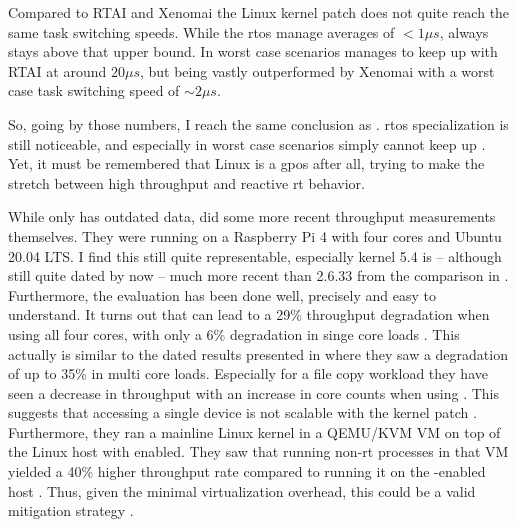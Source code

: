 \documentclass[10pt,twocolumn,a4paper]{article}
\begin{document}
Compared to RTAI and Xenomai the Linux kernel patch does not quite reach the same task switching speeds.
While the \acrshort{rtos} manage averages of $<1\mu s$,  always stays above that upper bound.
In worst case scenarios  manages to keep up with RTAI at around $20\mu s$, but being vastly outperformed by Xenomai with a worst case task switching speed of $\sim 2\mu s$.

So, going by those numbers, I reach the same conclusion as \cite{reghenzani_realtime_2019}.
\acrshort{rtos} specialization is still noticeable, and especially in worst case scenarios  simply cannot keep up \cite{reghenzani_realtime_2019}.
Yet, it must be remembered that Linux is a \acrshort{gpos} after all, trying to make the stretch between high throughput and reactive \acrshort{rt} behavior.

While \cite{reghenzani_realtime_2019} only has outdated data, \cite{li_performance_2023} did some more recent throughput measurements themselves.
They were running on a Raspberry Pi 4 with four cores and Ubuntu 20.04 LTS.
I find this still quite representable, especially kernel 5.4 is -- although still quite dated by now -- much more recent than 2.6.33 from the comparison in \cite{reghenzani_realtime_2019}.
Furthermore, the evaluation has been done well, precisely and easy to understand.
It turns out that  can lead to a 29\% throughput degradation when using all four cores, with only a 6\% degradation in singe core loads \cite{li_performance_2023}.
This actually is similar to the dated results presented in \cite{reghenzani_realtime_2019} where they saw a degradation of up to 35\% in multi core loads.
Especially for a file copy workload they have seen a decrease in throughput with an increase in core counts when using  \cite{li_performance_2023}.
This suggests that accessing a single device is not scalable with the kernel patch \cite{li_performance_2023}.
Furthermore, they ran a mainline Linux kernel in a QEMU/KVM VM on top of the Linux host with  enabled.
They saw that running non-\acrshort{rt} processes in that VM yielded a 40\% higher throughput rate compared to running it on the -enabled host \cite{li_performance_2023}.
Thus, given the minimal virtualization overhead, this could be a valid mitigation strategy \cite{li_performance_2023}.

\printglossaries

\printbibliography
\end{document}
